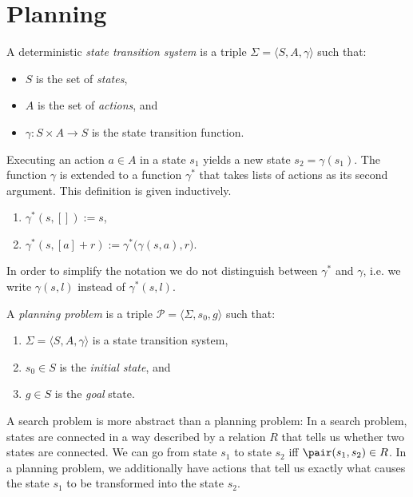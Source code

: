 \chapter{Planning}

\begin{Definition}
A deterministic \emph{state transition system} is a triple $\Sigma = \langle S, A, \gamma \rangle$ such that:
\begin{itemize}
\item $S$ is the set of \emph{states},
\item $A$ is the set of \emph{actions}, and
\item $\gamma: S \times A \rightarrow S$ is the state transition function. \eod
\end{itemize}
\end{Definition}

\noindent
Executing an action $a \in A$ in a state $s_1$ yields a new state $s_2 = \gamma(s_1)$.  The function
$\gamma$ is extended to a function $\gamma^*$ that takes lists of actions as its second argument.
This definition is given inductively.
\begin{enumerate}
\item $\gamma^*(s, []) := s$,
\item $\gamma^*(s, [a] + r) := \gamma^*\bigl(\gamma(s,a), r\bigr)$.
\end{enumerate}
In order to simplify the notation we do not distinguish between $\gamma^*$ and $\gamma$, i.e. we
write $\gamma(s, l)$ instead of $\gamma^*(s, l)$.
  
\begin{Definition}
A \emph{planning problem} is a triple $\mathcal{P} = \langle \Sigma, s_0, g \rangle$ such that:
\begin{enumerate}
\item $\Sigma = \langle S, A, \gamma \rangle$ is a state transition system,
\item $s_0 \in S$ is the \emph{initial state}, and
\item $g \in S$ is the \emph{goal} state.
\end{enumerate}
\end{Definition}

A search problem is more abstract than a planning problem:  In a search problem, states are
connected in a way described by a relation $R$ that tells us whether two states are connected.  We
can go from state $s_1$ to state $s_2$ iff $\pair(s_1, s_2) \in R$.  In a planning problem, we
additionally have actions that tell us exactly what causes the state $s_1$ to be transformed into
the state $s_2$.

